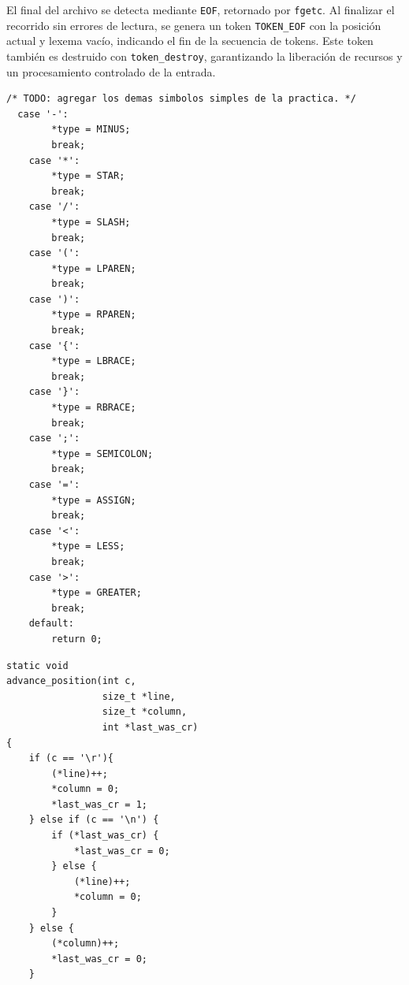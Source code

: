 \documentclass[12pt,letterpaper]{article}
\begin{document}
El final del archivo se detecta mediante \texttt{EOF}, retornado por \texttt{fgetc}. Al finalizar el recorrido sin errores de lectura, se genera un token \texttt{TOKEN\_EOF} con la posición actual y lexema vacío, indicando el fin de la secuencia de tokens. Este token también es destruido con \texttt{token\_destroy}, garantizando la liberación de recursos y un procesamiento controlado de la entrada.


\begin{lstlisting}[style=modernc, caption={\texttt{simple\_toke\_type}, símbolos simples.}]
  /* TODO: agregar los demas simbolos simples de la practica. */
  case '-':
        *type = MINUS;
        break;
    case '*':
        *type = STAR;
        break;
    case '/':
        *type = SLASH;
        break;
    case '(':
        *type = LPAREN;
        break;
    case ')':
        *type = RPAREN;
        break;
    case '{':
        *type = LBRACE;
        break;
    case '}':
        *type = RBRACE;
        break;
    case ';':
        *type = SEMICOLON;
        break;
    case '=':
        *type = ASSIGN;
        break;
    case '<':
        *type = LESS;
        break;
    case '>':
        *type = GREATER;
        break;
    default:
        return 0;
\end{lstlisting}

\begin{lstlisting}[style=modernc, caption={\texttt{advance\_position}, seguimiento de línea y columna.}]
static void
advance_position(int c,
                 size_t *line,
                 size_t *column,
                 int *last_was_cr)
{
    if (c == '\r'){
        (*line)++;
        *column = 0;
        *last_was_cr = 1;
    } else if (c == '\n') {
        if (*last_was_cr) {
            *last_was_cr = 0;
        } else {
            (*line)++;
            *column = 0;
        }
    } else {
        (*column)++;
        *last_was_cr = 0;
    }

\end{lstlisting}
\end{document}
